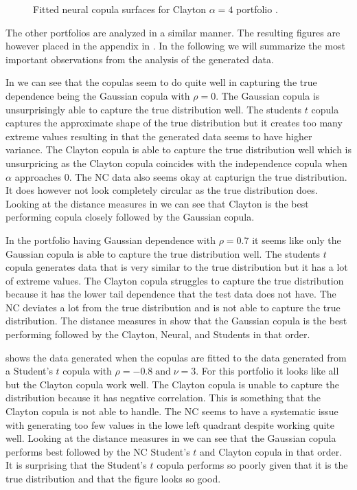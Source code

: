 \begin{figure}
\begin{minipage}{0.4\textwidth}
    \end{minipage}
    \caption{Fitted neural copula surfaces for Clayton $\alpha=4$ portfolio .}
    \label{fig:GeneratedDataClayton}
\end{figure}

The other portfolios are analyzed in a similar manner. The resulting figures are however placed in the appendix in . In the following we will summarize the most important observations from the analysis of the generated data. 

In  we can see that the copulas seem to do quite well in capturing the true dependence being the Gaussian copula with $\rho = 0$. The Gaussian copula is unsurprisingly able to capture the true distribution well. The students $t$ copula captures the approximate shape of the true distribution but it creates too many extreme values resulting in that the generated data seems to have higher variance. The Clayton copula is able to capture the true distribution well which is unsurpricing as the Clayton copula coincides with the independence copula when $\alpha $ approaches 0. The \gls{NC} data also seems okay at capturign the true distribution. It does however not look completely circular as the true distribution does. Looking at the distance measures in  we can see that Clayton is the best performing copula closely followed by the Gaussian copula.  

In  the portfolio having Gaussian dependence with $\rho = 0.7$ it seems like only the Gaussian copula is able to capture the true distribution well. The students $t$ copula generates data that is very similar to the true distribution but it has a lot of extreme values. The Clayton copula struggles to capture the true distribution because it has the lower tail dependence that the test data does not have. The \gls{NC} deviates a lot from the true distribution and is not able to capture the true distribution. The distance measures in  show that the Gaussian copula is the best performing followed by the Clayton, Neural, and Students in that order. 


 shows the data generated when the copulas are fitted to the data generated from a Student's $t$ copula with $\rho = -0.8 \; \mathrm{and} \; \nu = 3$. For this portfolio it looks like all but the Clayton copula work well. The Clayton copula is unable to capture the distribution because it has negative correlation. This is something that the Clayton copula is not able to handle. The \gls{NC} seems to have a systematic issue with generating too few values in the lowe left quadrant despite working quite well. Looking at the distance measures in  we can see that the Gaussian copula performs best followed by the \gls{NC} Student's $t$ and Clayton copula in that order. It is surprising that the Student's $t$ copula performs so poorly given that it is the true distribution and that the figure looks so good. 



